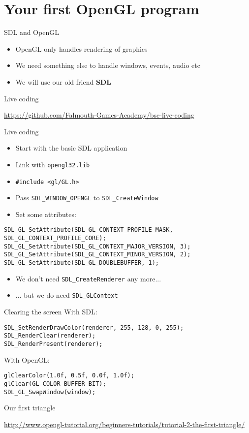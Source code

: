 \part{Your first OpenGL program}
\frame{\partpage}

\begin{frame}{SDL and OpenGL}
	\begin{itemize}
		\pause\item OpenGL only handles rendering of graphics
		\pause\item We need something else to handle windows, events, audio etc
		\pause\item We will use our old friend \textbf{SDL}
	\end{itemize}
\end{frame}

\begin{frame}{Live coding}
	\begin{center}
		\url{https://github.com/Falmouth-Games-Academy/bsc-live-coding}
	\end{center}
\end{frame}

\begin{frame}[fragile]{Live coding}
	\begin{itemize}
		\pause\item Start with the basic SDL application
		\pause\item Link with \texttt{opengl32.lib}
		\pause\item \lstinline{#include <gl/GL.h>}
		\pause\item Pass \lstinline{SDL_WINDOW_OPENGL} to \lstinline{SDL_CreateWindow}
		\pause\item Set some attributes:
	\end{itemize}
	\begin{lstlisting}
SDL_GL_SetAttribute(SDL_GL_CONTEXT_PROFILE_MASK, SDL_GL_CONTEXT_PROFILE_CORE);
SDL_GL_SetAttribute(SDL_GL_CONTEXT_MAJOR_VERSION, 3);
SDL_GL_SetAttribute(SDL_GL_CONTEXT_MINOR_VERSION, 2);
SDL_GL_SetAttribute(SDL_GL_DOUBLEBUFFER, 1);
	\end{lstlisting}
	\begin{itemize}
		\pause\item We don't need \lstinline{SDL_CreateRenderer} any more...
		\pause\item ... but we do need \lstinline{SDL_GLContext}
	\end{itemize}
\end{frame}

\begin{frame}[fragile]{Clearing the screen}
	\pause With SDL:
	\begin{lstlisting}
SDL_SetRenderDrawColor(renderer, 255, 128, 0, 255);
SDL_RenderClear(renderer);
SDL_RenderPresent(renderer);
	\end{lstlisting}
	
	\pause With OpenGL:
	\begin{lstlisting}
glClearColor(1.0f, 0.5f, 0.0f, 1.0f);
glClear(GL_COLOR_BUFFER_BIT);
SDL_GL_SwapWindow(window);
	\end{lstlisting}
\end{frame}

\begin{frame}{Our first triangle}
	\begin{center}
		\url{http://www.opengl-tutorial.org/beginners-tutorials/tutorial-2-the-first-triangle/}
	\end{center}
\end{frame}

